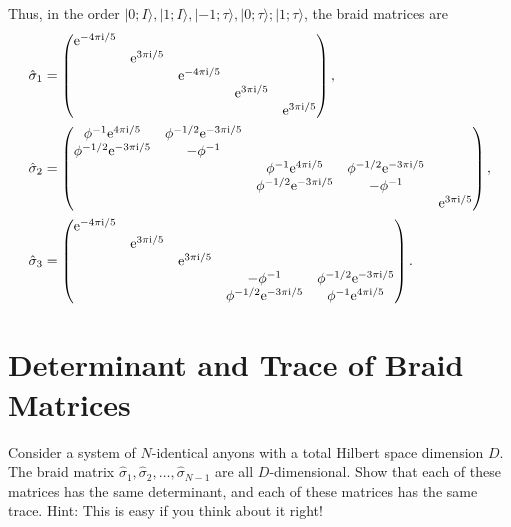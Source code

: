 Thus, in the order $|0;I \rangle ,|1;I \rangle ,|-1;\tau \rangle ,|0;\tau \rangle ;|1;\tau \rangle $, the braid matrices are
\begin{align}
\hat{\sigma }_{1} & =\begin{pmatrix}
\mathrm{e}^{-4\pi \mathrm{i} /5} &  &  &  & \\
 & \mathrm{e}^{3\pi \mathrm{i} /5} &  &  & \\
 &  & \mathrm{e}^{-4\pi \mathrm{i} /5} &  & \\
 &  &  & \mathrm{e}^{3\pi \mathrm{i} /5} & \\
 &  &  &  & \mathrm{e}^{3\pi \mathrm{i} /5}
\end{pmatrix} ,\notag\\
\hat{\sigma }_{2} & =\begin{pmatrix}
\phi ^{-1}\mathrm{e}^{4\pi \mathrm{i} /5} & \phi ^{-1/2}\mathrm{e}^{-3\pi \mathrm{i} /5} &  &  & \\
\phi ^{-1/2}\mathrm{e}^{-3\pi \mathrm{i} /5} & -\phi ^{-1} &  &  & \\
 &  & \phi ^{-1}\mathrm{e}^{4\pi \mathrm{i} /5} & \phi ^{-1/2}\mathrm{e}^{-3\pi \mathrm{i} /5} & \\
 &  & \phi ^{-1/2}\mathrm{e}^{-3\pi \mathrm{i} /5} & -\phi ^{-1} & \\
 &  &  &  & \mathrm{e}^{3\pi \mathrm{i} /5}
\end{pmatrix} ,\notag\\
\hat{\sigma }_{3} & =\begin{pmatrix}
\mathrm{e}^{-4\pi \mathrm{i} /5} &  &  &  & \\
 & \mathrm{e}^{3\pi \mathrm{i} /5} &  &  & \\
 &  & \mathrm{e}^{3\pi \mathrm{i} /5} &  & \\
 &  &  & -\phi ^{-1} & \phi ^{-1/2}\mathrm{e}^{-3\pi \mathrm{i} /5}\\
 &  &  & \phi ^{-1/2}\mathrm{e}^{-3\pi \mathrm{i} /5} & \phi ^{-1}\mathrm{e}^{4\pi \mathrm{i} /5}\label{eq:FibBraiding3}
\end{pmatrix} .
\end{align}
\section{Determinant and Trace of Braid Matrices}
Consider a system of $N$-identical anyons with a total Hilbert space dimension $D$. The braid matrix $\hat{\sigma }_{1} ,\hat{\sigma }_{2} ,\dotsc ,\hat{\sigma }_{N-1}$ are all $D$-dimensional. Show that each of these matrices has the same determinant, and each of these matrices has the same trace. Hint: This is easy if you think about it right!

